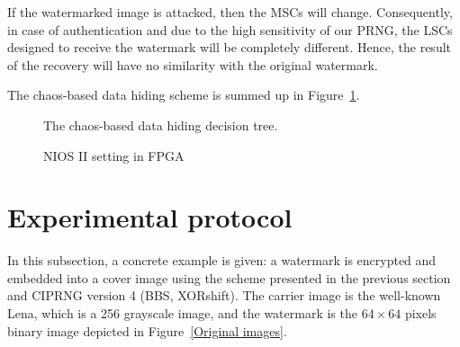 If the watermarked image is attacked, then the MSCs will change. Consequently, in case of authentication and due to the high sensitivity of our PRNG, the LSCs designed to receive the watermark will be completely different. Hence, the result of the recovery will have no similarity with the original watermark.

The chaos-based data hiding scheme is summed up in Figure~\ref{fig:organigramme}.

\begin{figure}[htb]
\centerline{}
\caption{The chaos-based data hiding decision tree.}
\label{fig:organigramme}
\end{figure}



\begin{figure}[h!]
\centering
{} \hspace{0.5cm}
 \hspace{0.5cm}
\caption{NIOS II setting in FPGA}
\label{Spatial MSCs and LSCs of Lena}
\end{figure}

\section{Experimental protocol}
In this subsection, a concrete example is given: a watermark is encrypted and embedded into a cover image using the scheme presented in the previous section and  CIPRNG version 4 (BBS, XORshift). The carrier image is the well-known Lena, which is a 256 grayscale image, and the watermark is the $64\times 64$ pixels binary image depicted in Figure~\ref{Original images}.


